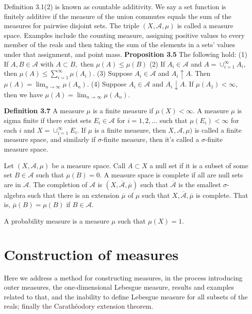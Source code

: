 \begin{sloppypar}
Definition 3.1(2) is known as countable additivity. We say a set
function is finitely additive if the measure of the union commutes equals the sum of the measures for pairwise disjoint sets.
The triple $(X, \mathcal{A}, \mu)$ is called a measure space.
Examples include the counting measure, assigning positive values to every member of the reals and then taking the sum of the elements in a sets' values under that assignment, and point mass.
\bigskip
\newline \textbf{Proposition 3.5} The following hold:
\newline (1) If $A,B \in \mathcal{A}$ with $A \subset B,$ then  $\mu(A) \leq \mu(B)$
\newline (2) If $A_i \in \mathcal{A}$ and $A = \cup_{i=1}^\infty A_i$, then $\mu(A) \leq \sum_{i=1}^\infty \mu(A_i).$
\newline (3) Suppose $A_i \in \mathcal{A}$ and $A_i \uparrow A$. Then $\mu(A) = \lim_{n \rightarrow \infty} \mu(A_n).$
\newline (4) Suppose $A_i \in \mathcal{A}$ and $A_i \downarrow A$. If $\mu(A_1) < \infty$, then we have $\mu(A) = \lim_{n \to \infty}\mu(A_n).$

\noindent \textbf{Definition 3.7} A measure $\mu$ is a finite measure if $\mu(X) < \infty$. A measure $\mu$ is sigma finite if there exist sets $E_i \in \mathcal{A}$ for $i=1,2,\ldots$ such that $\mu(E_i) < \infty$ for each $i$ and $X = \cup_{i=1}^\infty E_i$. If $\mu$ is a finite measure, then $X,\mathcal{A},\mu)$ is called a finite measure space, and similarly if $\sigma$-finite measure, then it's called a $\sigma$-finite measure space.

Let $(X, \mathcal{A}, \mu)$ be a measure space. Call $A \subset X$ a null set if it is a subset of some set $B \in \mathcal{A}$ such that $\mu(B) = 0$.
\newline A measure space is complete if all are null sets are in $\mathcal{A}$.
The completion of $\mathcal{A}$ is $(X, \overline{\mathcal{A}}, \overline{\mu})$ such that $\overline{\mathcal{A}}$ is the smallest $\sigma$-algebra such that there is an extension $\overline{\mu}$ of $\mu$ such that $X, \overline{\mathcal{A}},\overline{\mu}$ is complete.
That is, $\overline{\mu}(B) = \mu(B)$ if $B \in \mathcal{A}$.

A probability measure is a measure $\mu$ such that $\mu(X) = 1$.

\chapter{Construction of measures}
Here we address a method for constructing measures, in the process introducing outer measures, the one-dimensional Lebesgue measure, results and examples related to that, and the inability to define Lebesgue measure for all subsets of the reals; finally the Carath\'eodory extension theorem.

\end{sloppypar}

